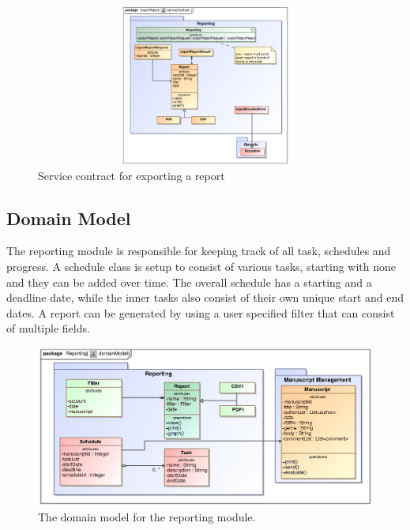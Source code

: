 \begin{enumerate}
\begin{figure}[h]
\includegraphics[height=200px, width=500px]{epsImages/Reporting/exportReport.eps}
\caption{Service contract for exporting a report}
\end{figure}


\subsection{Domain Model}
\par{The reporting module is responsible for keeping track of all task, schedules and progress. A schedule class is setup to consist of various tasks, starting with none and they can be added over time. The overall schedule has a starting and a deadline date, while the inner tasks also consist of their own unique start and end dates. A report can be generated by using a user specified filter that can consist of multiple fields.}

\begin{figure}[h]
\includegraphics[height=200px, width=500px]{epsImages/DomainModels/Reporting.eps}
\caption{The domain model for the reporting module.}
\end{figure}
\newpage

\end{enumerate}

